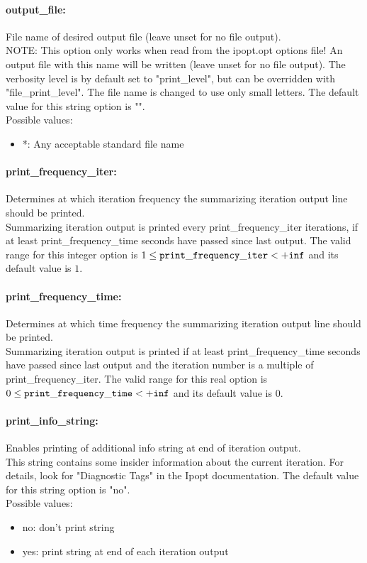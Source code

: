 \paragraph{output\_file:}\label{opt:output_file} File name of desired output file (leave unset for no file output). \\
 NOTE: This option only works when read from the ipopt.opt options file! An output file with this name will be written (leave unset for no file output).  The verbosity level is by default set to "print\_level", but can be overridden with "file\_print\_level".  The file name is changed to use only small letters. The default value for this string option is "".
\\ 
Possible values:
\begin{itemize}
   \item *: Any acceptable standard file name
\end{itemize}

\paragraph{print\_frequency\_iter:}\label{opt:print_frequency_iter} Determines at which iteration frequency the summarizing iteration output line should be printed. \\
 Summarizing iteration output is printed every print\_frequency\_iter iterations, if at least print\_frequency\_time seconds have passed since last output. The valid range for this integer option is
$1 \le {\tt print\_frequency\_iter } <  {\tt +inf}$
and its default value is $1$.


\paragraph{print\_frequency\_time:}\label{opt:print_frequency_time} Determines at which time frequency the summarizing iteration output line should be printed. \\
 Summarizing iteration output is printed if at least print\_frequency\_time seconds have passed since last output and the iteration number is a multiple of print\_frequency\_iter. The valid range for this real option is 
$0 \le {\tt print\_frequency\_time } <  {\tt +inf}$
and its default value is $0$.


\paragraph{print\_info\_string:}\label{opt:print_info_string} Enables printing of additional info string at end of iteration output. \\
 This string contains some insider information about the current iteration.  For details, look for "Diagnostic Tags" in the Ipopt documentation. The default value for this string option is "no".
\\ 
Possible values:
\begin{itemize}
   \item no: don't print string
   \item yes: print string at end of each iteration output
\end{itemize}

